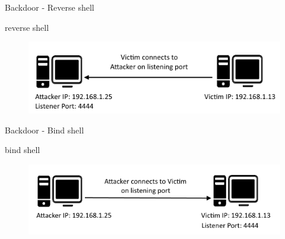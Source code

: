 \documentclass[10pt]{beamer}
\begin{document}
\begin{frame}{Backdoor - Reverse shell}
	
	\begin{alertblock}{reverse shell}
		  \begin{figure}
			\begin{center}
				\includegraphics[scale=0.6]{reverse-shell.png}
			\end{center}
  		  \end{figure}
    \end{alertblock}


\end{frame}


\begin{frame}{Backdoor - Bind shell}
	
	\begin{alertblock}{bind shell}
		  \begin{figure}
			\begin{center}
				\includegraphics[scale=0.6]{bind-shell.png}
			\end{center}
  		  \end{figure}
    \end{alertblock}


\end{frame}
\end{document}
